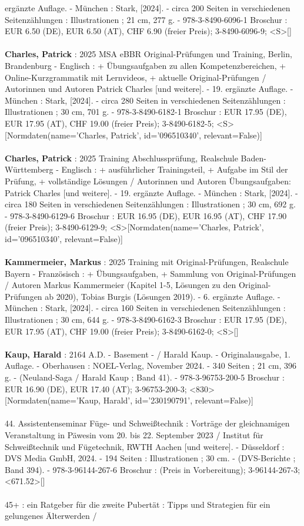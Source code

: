 \documentclass{article}
\begin{document}
\begin{multicols}{3}
ergänzte Auflage. - München : Stark, [2024]. - circa 200 Seiten in verschiedenen Seitenzählungen : Illustrationen ; 21 cm, 277 g. - 978-3-8490-6096-1 Broschur : EUR 6.50 (DE), EUR 6.50 (AT), CHF 6.90 (freier Preis); 3-8490-6096-9; <S>[]\\\\\textbf{Charles, Patrick} : 2025 MSA eBBR Original-Prüfungen und Training, Berlin, Brandenburg - Englisch : + Übungsaufgaben zu allen Kompetenzbereichen, + Online-Kurzgrammatik mit Lernvideos, + aktuelle Original-Prüfungen / Autorinnen und Autoren Patrick Charles [und weitere]. - 19. ergänzte Auflage. - München : Stark, [2024]. - circa 280 Seiten in verschiedenen Seitenzählungen : Illustrationen ; 30 cm, 701 g. - 978-3-8490-6182-1 Broschur : EUR 17.95 (DE), EUR 17.95 (AT), CHF 19.00 (freier Preis); 3-8490-6182-5; <S>[Normdaten(name='Charles, Patrick', id='096510340', relevant=False)]\\\\\textbf{Charles, Patrick} : 2025 Training Abschlussprüfung, Realschule Baden-Württemberg - Englisch : + ausführlicher Trainingsteil, + Aufgabe im Stil der Prüfung, + vollständige Lösungen / Autorinnen und Autoren Übungsaufgaben: Patrick Charles [und weitere]. - 19. ergänzte Auflage. - München : Stark, [2024]. - circa 180 Seiten in verschiedenen Seitenzählungen : Illustrationen ; 30 cm, 692 g. - 978-3-8490-6129-6 Broschur : EUR 16.95 (DE), EUR 16.95 (AT), CHF 17.90 (freier Preis); 3-8490-6129-9; <S>[Normdaten(name='Charles, Patrick', id='096510340', relevant=False)]\\\\\textbf{Kammermeier, Markus} : 2025 Training mit Original-Prüfungen, Realschule Bayern - Französisch : + Übungsaufgaben, + Sammlung von Original-Prüfungen / Autoren Markus Kammermeier (Kapitel 1-5, Lösungen zu den Original-Prüfungen ab 2020), Tobias Burgis (Lösungen 2019). - 6. ergänzte Auflage. - München : Stark, [2024]. - circa 160 Seiten in verschiedenen Seitenzählungen : Illustrationen ; 30 cm, 644 g. - 978-3-8490-6162-3 Broschur : EUR 17.95 (DE), EUR 17.95 (AT), CHF 19.00 (freier Preis); 3-8490-6162-0; <S>[]\\\\\textbf{Kaup, Harald} : 2164 A.D. - Basement - / Harald Kaup. - Originalausgabe, 1. Auflage. - Oberhausen : NOEL-Verlag, November 2024. - 340 Seiten ; 21 cm, 396 g. - (Neuland-Saga / Harald Kaup ; Band 41). - 978-3-96753-200-5 Broschur : EUR 16.90 (DE), EUR 17.40 (AT); 3-96753-200-3; <830>[Normdaten(name='Kaup, Harald', id='230190791', relevant=False)]\\\\44. Assistentenseminar Füge- und Schweißtechnik : Vorträge der gleichnamigen Veranstaltung in Päwesin vom 20. bis 22. September 2023 / Institut für Schweißtechnik und Fügetechnik, RWTH Aachen [und weitere]. - Düsseldorf : DVS Media GmbH, 2024. - 194 Seiten : Illustrationen ; 30 cm. - (DVS-Berichte ; Band 394). - 978-3-96144-267-6 Broschur : (Preis in Vorbereitung); 3-96144-267-3; <671.52>[]\\\\45+ : ein Ratgeber für die zweite Pubertät : Tipps und Strategien für ein gelungenes Älterwerden / 
\end{multicols}
\end{document}
